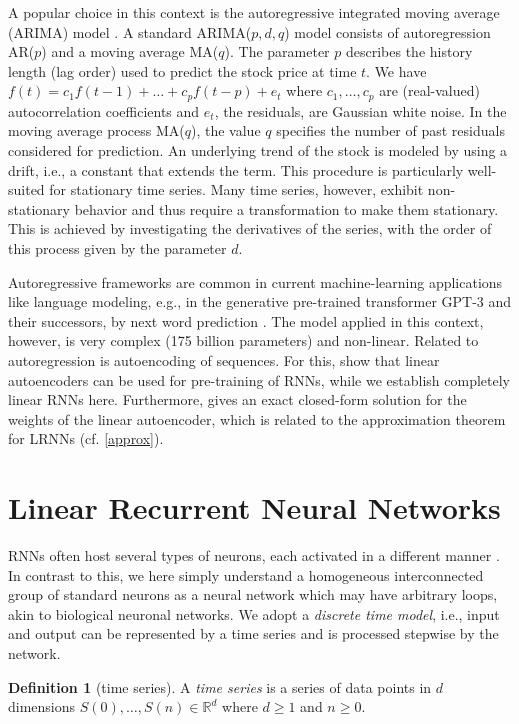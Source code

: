 \documentclass[twoside,11pt]{article}
\theoremstyle{definition}
\newtheorem{defn}{Definition}
\begin{document}
A popular choice in this context is the autoregressive integrated moving average
(ARIMA) model \citep{HK08,HA13}. A standard ARIMA($p,d,q$) model consists of
autoregression AR($p$) and a moving average MA($q$). The parameter $p$ describes
the history length (lag order) used to predict the stock price at time $t$. We
have $f(t) = c_1 f(t-1) + \dots + c_p f(t-p) + e_t$ where $c_1,\dots,c_p$ are
(real-valued) autocorrelation coefficients and $e_t$, the residuals, are
Gaussian white noise. In the moving average process MA($q$), the value $q$
specifies the number of past residuals considered for prediction. An underlying
trend of the stock is modeled by using a drift, i.e., a constant that extends
the term. This procedure is particularly well-suited for stationary time series.
Many time series, however, exhibit non-stationary behavior and thus require a
transformation to make them stationary. This is achieved by investigating the
derivatives of the series, with the order of this process given by the parameter
$d$.

Autoregressive frameworks are common in current machine-learning applications
like language modeling, e.g., in the generative pre-trained transformer GPT-3 and their successors,
by next word prediction \citep{BM+20}. The model applied in this context,
however, is very complex (175 billion parameters) and non-linear.
Related to autoregression is autoencoding of sequences. For this, \citet{PS14}
show that linear autoencoders can be used for pre-training of RNNs, while we
establish completely linear RNNs here. Furthermore, \citet{Spe06} gives an
exact closed-form solution for the weights of the linear autoencoder, which is
related to the approximation theorem for LRNNs (cf. \cref{approx}).

\section{Linear Recurrent Neural Networks}\label{define}

RNNs often host several types of neurons, each activated in a different manner
\citep{Elm90,HS97}. In contrast to this, we here simply understand a homogeneous
interconnected group of standard neurons as a neural network which may have
arbitrary loops, akin to biological neuronal networks. We adopt a \emph{discrete
time model}, i.e., input and output can be represented by a time series and is
processed stepwise by the network.

\begin{defn}[time series]
A \emph{time series} is a series of data points in $d$ dimensions
$S(0),\dots,S(n) \in \mathbb{R}^d$ where $d \ge 1$ and $n \ge 0$.
\end{defn}
\end{document}

